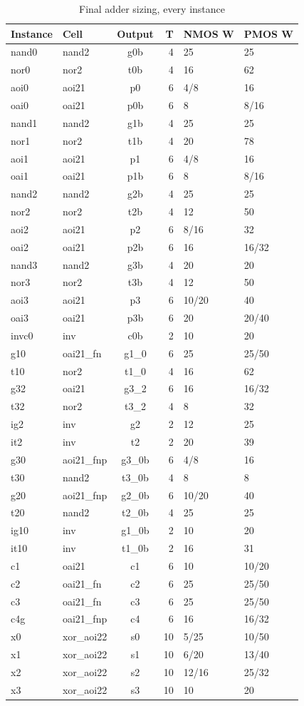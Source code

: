 \documentclass[10pt,a4paper]{article}
\begin{document}
\begin{table}[H]\centering
\scriptsize
\caption{Final adder sizing, every instance}
\begin{tabular}{llcrll}
\toprule
\textbf{Instance} & \textbf{Cell} & \textbf{Output} & \textbf{T} & \textbf{NMOS W} & \textbf{PMOS W} \\
\midrule
nand0 & nand2 & g0b & 4 & 25 & 25 \\
nor0 & nor2 & t0b & 4 & 16 & 62 \\
aoi0 & aoi21 & p0 & 6 & 4/8 & 16 \\
oai0 & oai21 & p0b & 6 & 8 & 8/16 \\
nand1 & nand2 & g1b & 4 & 25 & 25 \\
nor1 & nor2 & t1b & 4 & 20 & 78 \\
aoi1 & aoi21 & p1 & 6 & 4/8 & 16 \\
oai1 & oai21 & p1b & 6 & 8 & 8/16 \\
nand2 & nand2 & g2b & 4 & 25 & 25 \\
nor2 & nor2 & t2b & 4 & 12 & 50 \\
aoi2 & aoi21 & p2 & 6 & 8/16 & 32 \\
oai2 & oai21 & p2b & 6 & 16 & 16/32 \\
nand3 & nand2 & g3b & 4 & 20 & 20 \\
nor3 & nor2 & t3b & 4 & 12 & 50 \\
aoi3 & aoi21 & p3 & 6 & 10/20 & 40 \\
oai3 & oai21 & p3b & 6 & 20 & 20/40 \\
invc0 & inv & c0b & 2 & 10 & 20 \\
g10 & oai21\_fn & g1\_0 & 6 & 25 & 25/50 \\
t10 & nor2 & t1\_0 & 4 & 16 & 62 \\
g32 & oai21 & g3\_2 & 6 & 16 & 16/32 \\
t32 & nor2 & t3\_2 & 4 & 8 & 32 \\
ig2 & inv & g2 & 2 & 12 & 25 \\
it2 & inv & t2 & 2 & 20 & 39 \\
g30 & aoi21\_fnp & g3\_0b & 6 & 4/8 & 16 \\
t30 & nand2 & t3\_0b & 4 & 8 & 8 \\
g20 & aoi21\_fnp & g2\_0b & 6 & 10/20 & 40 \\
t20 & nand2 & t2\_0b & 4 & 25 & 25 \\
ig10 & inv & g1\_0b & 2 & 10 & 20 \\
it10 & inv & t1\_0b & 2 & 16 & 31 \\
c1 & oai21 & c1 & 6 & 10 & 10/20 \\
c2 & oai21\_fn & c2 & 6 & 25 & 25/50 \\
c3 & oai21\_fn & c3 & 6 & 25 & 25/50 \\
c4g & oai21\_fnp & c4 & 6 & 16 & 16/32 \\
x0 & xor\_aoi22 & s0 & 10 & 5/25 & 10/50 \\
x1 & xor\_aoi22 & s1 & 10 & 6/20 & 13/40 \\
x2 & xor\_aoi22 & s2 & 10 & 12/16 & 25/32 \\
x3 & xor\_aoi22 & s3 & 10 & 10 & 20 \\
\bottomrule
\end{tabular}
\end{table}
\end{document}
